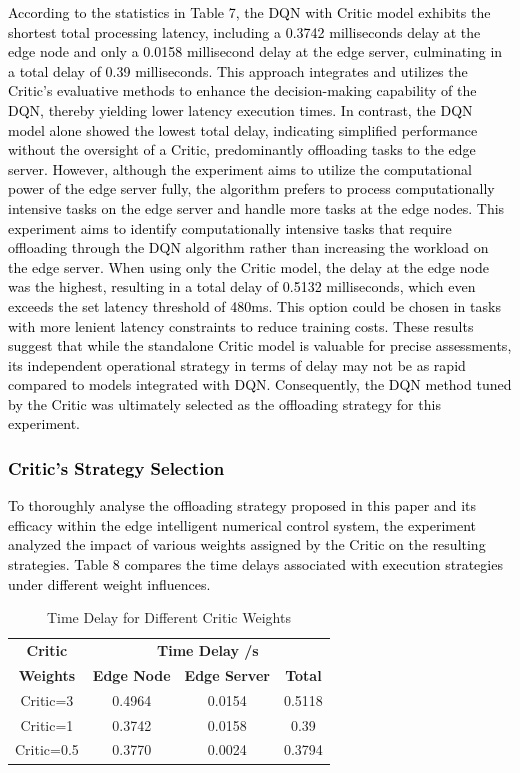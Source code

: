\documentclass[preprint,12pt]{elsarticle}
\begin{document}
\textcolor{black}{According to the statistics in Table 7, the DQN with Critic model exhibits the shortest total processing latency, including a 0.3742 milliseconds delay at the edge node and only a 0.0158 millisecond delay at the edge server, culminating in a total delay of 0.39 milliseconds. This approach integrates and utilizes the Critic's evaluative methods to enhance the decision-making capability of the DQN, thereby yielding lower latency execution times. In contrast, the DQN model alone showed the lowest total delay, indicating simplified performance without the oversight of a Critic, predominantly offloading tasks to the edge server. However, although the experiment aims to utilize the computational power of the edge server fully, the algorithm prefers to process computationally intensive tasks on the edge server and handle more tasks at the edge nodes. This experiment aims to identify computationally intensive tasks that require offloading through the DQN algorithm rather than increasing the workload on the edge server. When using only the Critic model, the delay at the edge node was the highest, resulting in a total delay of 0.5132 milliseconds, which even exceeds the set latency threshold of 480ms. This option could be chosen in tasks with more lenient latency constraints to reduce training costs. These results suggest that while the standalone Critic model is valuable for precise assessments, its independent operational strategy in terms of delay may not be as rapid compared to models integrated with DQN. Consequently, the DQN method tuned by the Critic was ultimately selected as the offloading strategy for this experiment.}

\textcolor{black}{\subsubsection{Critic's Strategy Selection}}

\textcolor{black}{To thoroughly analyse the offloading strategy proposed in this paper and its efficacy within the edge intelligent numerical control system, the experiment analyzed the impact of various weights assigned by the Critic on the resulting strategies. Table 8 compares the time delays associated with execution strategies under different weight influences.}

\begin{table}[ht!]
\centering
\begin{tabular}{c c c c}
\hline
\textbf{Critic} & \multicolumn{3}{c}{\textbf{Time Delay /s}} \\
\textbf{Weights} & \textbf{Edge Node} & \textbf{Edge Server} & \textbf{Total} \\
\hline
Critic=3 & 0.4964 & 0.0154 & 0.5118 \\
Critic=1 & 0.3742 & 0.0158 & 0.39   \\
Critic=0.5 & 0.3770 & 0.0024 & 0.3794 \\
\hline
\end{tabular}
\caption{Time Delay for Different Critic Weights}
\label{tab:table 8}
\end{table}
\end{document}
